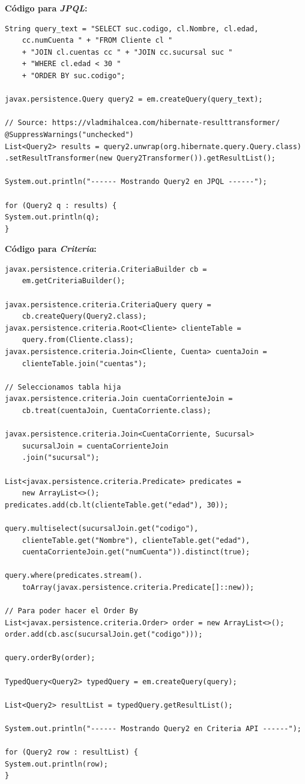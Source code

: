 \documentclass[11pt,a4paper]{article}
\begin{document}
\textbf{Código para \textit{JPQL}:}
\begin{lstlisting}
String query_text = "SELECT suc.codigo, cl.Nombre, cl.edad, 
	cc.numCuenta " + "FROM Cliente cl "
	+ "JOIN cl.cuentas cc " + "JOIN cc.sucursal suc " 
	+ "WHERE cl.edad < 30 "
	+ "ORDER BY suc.codigo";

javax.persistence.Query query2 = em.createQuery(query_text);

// Source: https://vladmihalcea.com/hibernate-resulttransformer/
@SuppressWarnings("unchecked")
List<Query2> results = query2.unwrap(org.hibernate.query.Query.class)
.setResultTransformer(new Query2Transformer()).getResultList();

System.out.println("------ Mostrando Query2 en JPQL ------");

for (Query2 q : results) {
System.out.println(q);
}
\end{lstlisting}

\textbf{Código para \textit{Criteria}:}
\begin{lstlisting}
javax.persistence.criteria.CriteriaBuilder cb = 
	em.getCriteriaBuilder();

javax.persistence.criteria.CriteriaQuery query = 
	cb.createQuery(Query2.class);
javax.persistence.criteria.Root<Cliente> clienteTable = 
	query.from(Cliente.class);
javax.persistence.criteria.Join<Cliente, Cuenta> cuentaJoin = 
	clienteTable.join("cuentas");

// Seleccionamos tabla hija
javax.persistence.criteria.Join cuentaCorrienteJoin = 
	cb.treat(cuentaJoin, CuentaCorriente.class);

javax.persistence.criteria.Join<CuentaCorriente, Sucursal> 
	sucursalJoin = cuentaCorrienteJoin
	.join("sucursal");

List<javax.persistence.criteria.Predicate> predicates = 
	new ArrayList<>();
predicates.add(cb.lt(clienteTable.get("edad"), 30));

query.multiselect(sucursalJoin.get("codigo"), 
	clienteTable.get("Nombre"), clienteTable.get("edad"),
	cuentaCorrienteJoin.get("numCuenta")).distinct(true);

query.where(predicates.stream().
	toArray(javax.persistence.criteria.Predicate[]::new));

// Para poder hacer el Order By
List<javax.persistence.criteria.Order> order = new ArrayList<>();
order.add(cb.asc(sucursalJoin.get("codigo")));

query.orderBy(order);

TypedQuery<Query2> typedQuery = em.createQuery(query);

List<Query2> resultList = typedQuery.getResultList();

System.out.println("------ Mostrando Query2 en Criteria API ------");

for (Query2 row : resultList) {
System.out.println(row);
}
\end{lstlisting}
\end{document}
